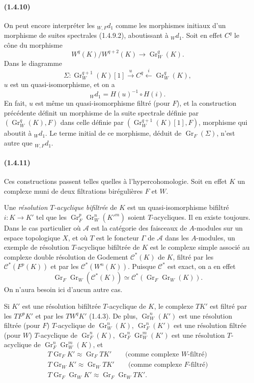 \documentclass[10pt]{article}
\newcommand{\Gr}{\operatorname{Gr}}
\newcommand{\calA}{\mathcal A}
\begin{document}
\paragraph{(1.4.10)} On peut encore interpréter les ${}_{W,F}d_1$ comme les morphismes initiaux d'un morphisme de suites spectrales (1.4.9.2), aboutissant à ${}_Wd_1$. Soit en effet $C^q$ le cône du morphisme
\[
W^q(K)/W^{q+2}(K)\longrightarrow\Gr_W^q(K).
\]
Dans le diagramme
\[
\Sigma:\Gr_W^{q+1}(K)[1]\xrightarrow{u} C^q\xleftarrow{i}\Gr_W^q(K),
\]
$u$ est un quasi-isomorphisme, et on a
\[
{}_Wd_1=H(u)^{-1}\circ H(i).
\]
En fait, $u$ est même un quasi-isomorphisme filtré (pour $F$), et la construction précédente définit un morphisme de la suite spectrale définie par $(\Gr_W^q(K),F)$ dans celle définie par $(\Gr_W^{q+1}(K)[1],F)$, morphisme qui aboutit à ${}_Wd_1$. Le terme initial de ce morphisme, déduit de $\Gr_F(\Sigma)$, n'est autre que ${}_{W,F}d_1$.

\paragraph{(1.4.11)} Ces constructions passent telles quelles à l'hypercohomologie. Soit en effet $K$ un complexe muni de deux filtrations birégulières $F$ et $W$.

Une \emph{résolution $T$-acyclique bifiltrée} de $K$ est un quasi-isomorphisme bifiltré $i:K\to K'$ tel que les $\Gr_F^p\Gr_W^n(K'^m)$ soient $T$-acycliques. Il en existe toujours. Dans le cas particulier où $\calA$ est la catégorie des faisceaux de $A$-modules sur un espace topologique $X$, et où $T$ est le foncteur $\Gamma$ de $\calA$ dans les $A$-modules, un exemple de résolution $T$-acyclique bifiltrée de $K$ est le complexe simple associé au complexe double résolution de Godement $\mathcal C^*(K)$ de $K$, filtré par les $\mathcal C^*(F^p(K))$ et par les $\mathcal C^*(W^n(K))$. Puisque $\mathcal C^*$ est exact, on a en effet
\[
\Gr_F\Gr_W(\mathcal C^*(K))\simeq \mathcal C^*(\Gr_F\Gr_W(K)).
\]
On n'aura besoin ici d'aucun autre cas.

Si $K'$ est une résolution bifiltrée $T$-acyclique de $K$, le complexe $TK'$ est filtré par les $TF^pK'$ et par les $TW^qK'$ (1.4.3). De plus, $\Gr_W^n(K')$ est une résolution filtrée (pour $F$) $T$-acyclique de $\Gr_W^n(K)$, $\Gr_F^n(K')$ est une résolution filtrée (pour $W$) $T$-acyclique de $\Gr_F^n(K)$, $\Gr_F^n\Gr_W^m(K')$ est une résolution $T$-acyclique de $\Gr_F^n\Gr_W^m(K)$, et
\[
\begin{gathered}
T\Gr_FK'\approx\Gr_FTK'\qquad\text{(comme complexe $W$-filtré)}\\
T\Gr_WK'\approx\Gr_WTK'\qquad\text{(comme complexe $F$-filtré)}\\
T\Gr_F\Gr_WK'\approx\Gr_F\Gr_WTK'.
\end{gathered}
\]
\end{document}
